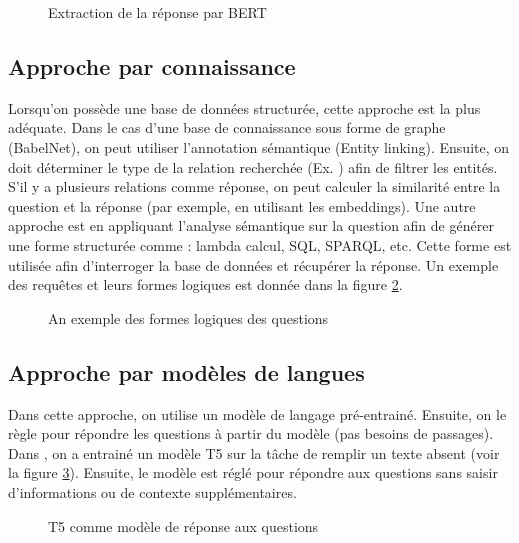 \documentclass{KodeBook}
\begin{document}
\begin{figure}[!ht]
	\centering
	\caption{Extraction de la réponse par BERT \cite{2019-jurafsky-martin}}
	\label{fig:qr-ri-devlin}
\end{figure}

\subsection{Approche par connaissance}

Lorsqu'on possède une base de données structurée, cette approche est la plus adéquate. 
Dans le cas d'une base de connaissance sous forme de graphe (BabelNet), on peut utiliser l'annotation sémantique (Entity linking). 
Ensuite, on doit déterminer le type de la relation recherchée (Ex. ) afin de filtrer les entités.
S'il y a plusieurs relations comme réponse, on peut calculer la similarité entre la question et la réponse (par exemple, en utilisant les embeddings). 
Une autre approche est en appliquant l'analyse sémantique sur la question afin de générer une forme structurée comme : lambda calcul, SQL, SPARQL, etc.
Cette forme est utilisée afin d'interroger la base de données et récupérer la réponse.
Un exemple des requêtes et leurs formes logiques est donnée dans la figure \ref{fig:qr-conn}.

\begin{figure}[!ht]
	\centering
	\caption{An exemple des formes logiques des questions \cite{2020-jurafsky-martin}}
	\label{fig:qr-conn}
\end{figure}

\subsection{Approche par modèles de langues}

Dans cette approche, on utilise un modèle de langage pré-entrainé. 
Ensuite, on le règle pour répondre les questions à partir du modèle (pas besoins de passages). 
Dans \cite{2020-roberts-al}, on a entrainé un modèle T5 sur la tâche de remplir un texte absent (voir la figure \ref{fig:qr-modele-t5}).
Ensuite, le modèle est réglé pour répondre aux questions sans saisir d'informations ou de contexte supplémentaires.

\begin{figure}[!ht]
	\centering
	\caption{T5 comme modèle de réponse aux questions \cite{2020-roberts-al}}
	\label{fig:qr-modele-t5}
\end{figure}
\end{document}

